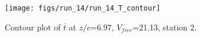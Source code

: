 \begin{figure}[H]
\centering
\texttt{[image: figs/run\_14/run\_14\_T\_contour]}
\caption{Contour plot of $\overline{t}$ at $z/c$=6.97, $V_{free}$=21.13, station 2.}
\label{fig:run_14_T_contour}
\end{figure}


